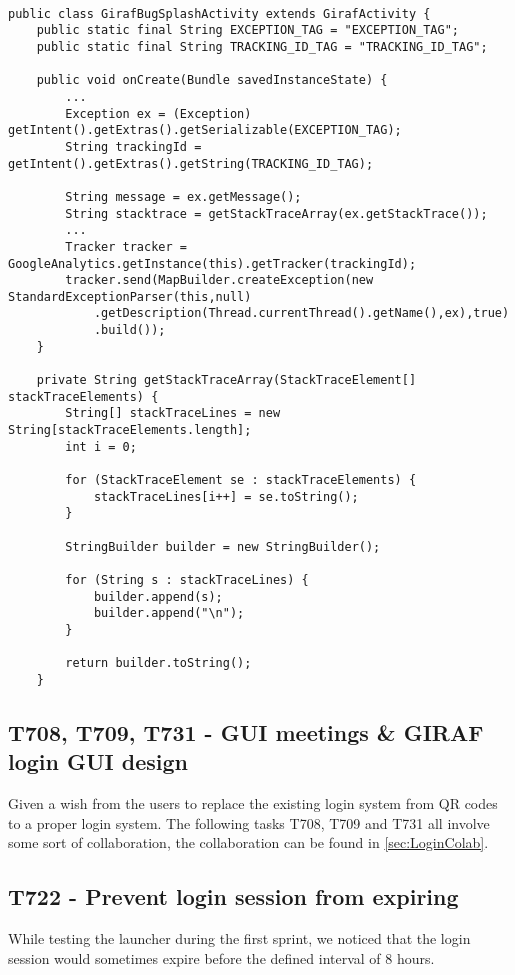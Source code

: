 \begin{minipage}[H]{\linewidth}
\begin{lstlisting}[caption = Our approach to outputting the stack trace, label = BugOurSol]

public class GirafBugSplashActivity extends GirafActivity {
	public static final String EXCEPTION_TAG = "EXCEPTION_TAG";
    public static final String TRACKING_ID_TAG = "TRACKING_ID_TAG";
    
	public void onCreate(Bundle savedInstanceState) {
		...
		Exception ex = (Exception) getIntent().getExtras().getSerializable(EXCEPTION_TAG); 
		String trackingId = getIntent().getExtras().getString(TRACKING_ID_TAG);
		
		String message = ex.getMessage();
        String stacktrace = getStackTraceArray(ex.getStackTrace());
        ...
        Tracker tracker = GoogleAnalytics.getInstance(this).getTracker(trackingId);
        tracker.send(MapBuilder.createException(new StandardExceptionParser(this,null)
            .getDescription(Thread.currentThread().getName(),ex),true)
            .build());
    }

	private String getStackTraceArray(StackTraceElement[] stackTraceElements) {
        String[] stackTraceLines = new String[stackTraceElements.length];
        int i = 0;
        
        for (StackTraceElement se : stackTraceElements) {
            stackTraceLines[i++] = se.toString();
        }
        
        StringBuilder builder = new StringBuilder();
        
        for (String s : stackTraceLines) {
            builder.append(s);
            builder.append("\n");
        }
        
        return builder.toString();
    }
\end{lstlisting}
\end{minipage}

\subsection{T708, T709, T731 -  GUI meetings \& GIRAF login GUI design}
Given a wish from the users to replace the existing login system from QR codes
to a proper login system. The following tasks T708, T709 and T731 all involve
some sort of collaboration, the collaboration can be found in
\autoref{sec:LoginColab}.

\subsection{T722 - Prevent login session from expiring}
While testing the launcher during the first sprint, we noticed that the login
session would sometimes expire before the defined interval of 8 hours.\nl

